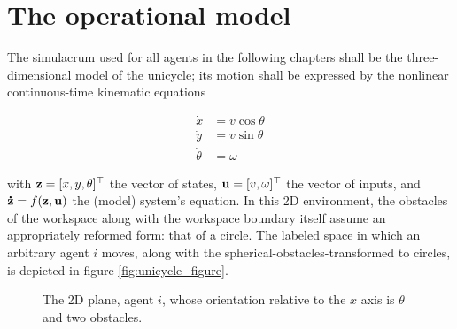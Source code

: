 \section{The operational model}

The simulacrum used for all agents in the following chapters shall be the
three-dimensional model of the unicycle; its motion shall be expressed by the
nonlinear continuous-time kinematic equations

\begin{align}
\label{eq:unicycle_kinematic}
  \dot{x}       &= v \cos\theta \\
  \dot{y}       &= v \sin\theta \\
  \dot{\theta}  &= \omega
\end{align}

with $\bm{\mathbf{z}} = [x,y,\theta]^{\top}$ the vector of states,
$\bm{\mathbf{u}} = [v, \omega]^{\top}$ the vector of inputs, and $\bm{\mathbf{\dot{z}}} =
f(\bm{\mathbf{z}}, \bm{\mathbf{u}})$ the (model) system's equation. In this 2D environment,
the obstacles of the workspace along with the workspace boundary itself
assume an appropriately reformed form: that of a circle. The labeled space in
which an arbitrary agent $i$ moves, along with the
spherical-obstacles-transformed to circles, is depicted in figure
\eqref{fig:unicycle_figure}.

\begin{figure}[H]\centering
  
  \caption{The 2D plane, agent $i$, whose orientation relative to the $x$
    axis is $\theta$ and two obstacles.}
  \label{fig:unicycle_figure}
\end{figure}
